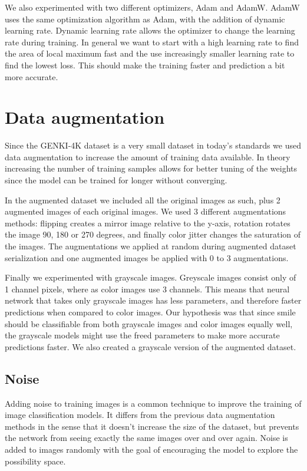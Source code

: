 \documentclass[12pt,a4paper,english
]{tunithesis}
\begin{document}
We also experimented with two different optimizers, Adam and AdamW. AdamW uses the same optimization algorithm as Adam, with the addition of dynamic learning rate. Dynamic learning rate allows the optimizer to change the learning rate during training. In general we want to start with a high learning rate to find the area of local maximum fast and the use increasingly smaller learning rate to find the lowest loss. This should make the training faster and prediction a bit more accurate.~\cite{adamw}

\section{Data augmentation}
\label{sec:dataaug}
Since the GENKI-4K dataset is a very small dataset in today's standards we used data augmentation to increase the amount of training data available. In theory increasing the number of training samples allows for better tuning of the weights since the model can be trained for longer without converging.\cite{dlbook}

In the augmented dataset we included all the original images as such, plus 2 augmented images of each original images. We used 3 different augmentations methods: flipping creates a mirror image relative to the y-axis, rotation rotates the image 90, 180 or 270 degrees, and finally color jitter changes the saturation of the images. The augmentations we applied at random during augmented dataset serialization and one augmented images be applied with 0 to 3 augmentations.

Finally we experimented with grayscale images. Greyscale images consist only of 1 channel pixels, where as color images use 3 channels. This means that neural network that takes only grayscale images has less parameters, and therefore faster predictions when compared to color images. Our hypothesis was that since smile should be classifiable from both grayscale images and color images equally well, the grayscale models might use the freed parameters to make more accurate predictions faster. We also created a grayscale version of the augmented dataset.

\subsection{Noise}
Adding noise to training images is a common technique to improve the training of image classification models. It differs from the previous data augmentation methods in the sense that it doesn't increase the size of the dataset, but prevents the network from seeing exactly the same images over and over again. Noise is added to images randomly with the goal of encouraging the model to explore the possibility space.\cite{dlbook}
\end{document}
